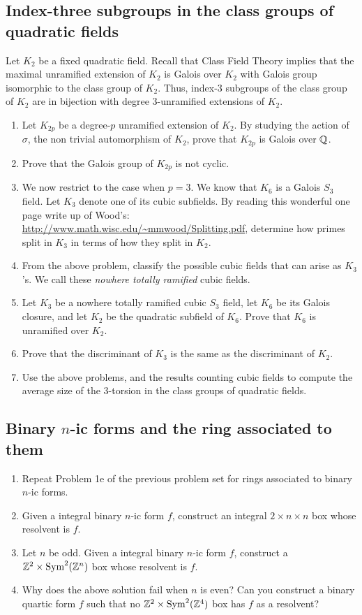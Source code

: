 \documentclass[12pt,amsfont]{amsart}
\begin{document}
\subsection{
\textbf{Index-three subgroups in the class groups of quadratic fields}}
Let $K_2$ be a fixed quadratic field. Recall that Class Field Theory
implies that the maximal unramified extension of $K_2$ is Galois over
$K_2$ with Galois group isomorphic to the class group of $K_2$.  Thus,
index-$3$ subgroups of the class group of $K_2$ are in bijection with
degree $3$-unramified extensions of $K_2$.
\begin{enumerate}
\item Let $K_{2p}$ be a degree-$p$ unramified extension of $K_2$. By
  studying the action of $\sigma$, the non trivial automorphism of
  $K_2$, prove that $K_{2p}$ is Galois over ${\mathbb Q}$.
\item Prove that the Galois group of $K_{2p}$ is not cyclic.
\item We now restrict to the case when $p=3$. We know that $K_6$ is a
  Galois $S_3$ field. Let $K_3$ denote one of its cubic subfields. By
  reading this wonderful one page write up of Wood's:
  \url{http://www.math.wisc.edu/~mmwood/Splitting.pdf}, determine how primes
  split in $K_3$ in terms of how they split in $K_2$.
\item From the above problem, classify the possible cubic fields that can arise as $K_3$'s. We call these {\it nowhere totally ramified} cubic fields.
\item Let $K_3$ be a nowhere totally ramified cubic $S_3$ field, let
  $K_6$ be its Galois closure, and let $K_2$ be the quadratic subfield
  of $K_6$. Prove that $K_6$ is unramified over $K_2$.
\item Prove that the discriminant of $K_3$ is the same as the
  discriminant of $K_2$.
\item Use the above problems, and the results counting cubic fields to
  compute the average size of the $3$-torsion in the class groups of
  quadratic fields.
\end{enumerate}

\subsection{
\textbf{Binary $n$-ic forms and the ring associated to them}}
\begin{enumerate}
\item Repeat Problem 1e of the previous problem set for rings associated to binary $n$-ic forms.
\item Given a integral binary $n$-ic form $f$, construct an integral
  $2\times n\times n$ box whose resolvent is $f$.
\item Let $n$ be odd. Given a integral binary $n$-ic form $f$,
  construct a ${\mathbb Z}^2\times \operatorname{Sym}^2({\mathbb Z}^n)$ box whose resolvent is $f$.
\item Why does the above solution fail when $n$ is even? Can you
  construct a binary quartic form $f$ such that no ${\mathbb Z}^2\times
  \operatorname{Sym}^2({\mathbb Z}^4)$ box has $f$ as a resolvent?
\end{enumerate}
\end{document}
